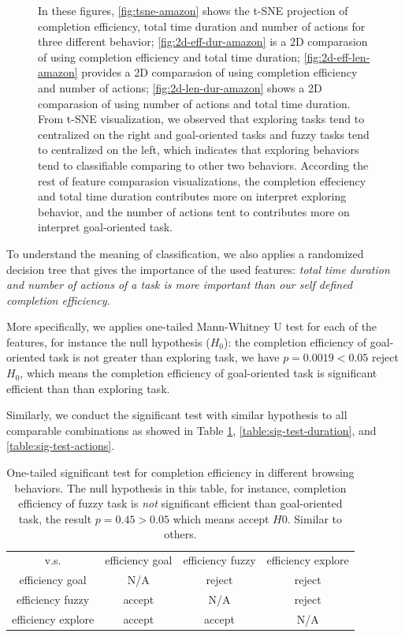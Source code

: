 \begin{figure}
    \caption{In these figures, \ref{fig:tsne-amazon} shows the t-SNE projection
    of completion efficiency, total time duration and number of actions for three different behavior;
    \ref{fig:2d-eff-dur-amazon} is a 2D comparasion of using completion efficiency and total time duration;
    \ref{fig:2d-eff-len-amazon} provides a 2D comparasion of using completion efficiency and number of actions;
    \ref{fig:2d-len-dur-amazon} shows a 2D comparasion of using number of actions and total time duration.
    From t-SNE visualization, we observed that exploring tasks tend to centralized on the right and goal-oriented
    tasks and fuzzy tasks tend to centralized on the left, which indicates that exploring behaviors tend to classifiable
    comparing to other two behaviors. According the rest of feature comparasion visualizations, the completion effeciency and total time duration
    contributes more on interpret exploring behavior, and the number of actions tent to
    contributes more on interpret goal-oriented task.}
    \label{fig:general-amazon}
\end{figure}

To understand the meaning of classification, we also applies a randomized decision tree
that gives the importance of the used features: \emph{total time duration and number of actions
of a task is more important than our self defined completion efficiency.}

More specifically, we applies one-tailed Mann-Whitney U test for each of the features,
for instance the null hypothesis ($H_0$): the completion efficiency of goal-oriented task 
is not greater than exploring task, we have $p = 0.0019 < 0.05$ reject $H_0$, which means
the completion efficiency of goal-oriented task is significant efficient than than exploring task.

Similarly, we conduct the significant test with similar hypothesis 
to all comparable combinations as showed in Table \ref{table:sig-test-efficiency}, \ref{table:sig-test-duration}, and \ref{table:sig-test-actions}.

\begin{table}[H]
    \small
    \centering
    \caption{One-tailed significant test for completion efficiency in different browsing behaviors.
    The null hypothesis in this table, for instance, completion efficiency of fuzzy task
    is \emph{not} significant efficient than goal-oriented task, the result $p=0.45>0.05$ which means
    accept $H0$. Similar to others.}
        \begin{tabular}{cccc}
            \toprule
              v.s.             & efficiency goal & efficiency fuzzy & efficiency explore \\
            efficiency goal    & N/A             & reject           & reject             \\
            efficiency fuzzy   & accept          & N/A              & reject             \\
            efficiency explore & accept          & accept           & N/A                \\
            \bottomrule
        \end{tabular}
        \label{table:sig-test-efficiency}
\end{table}

